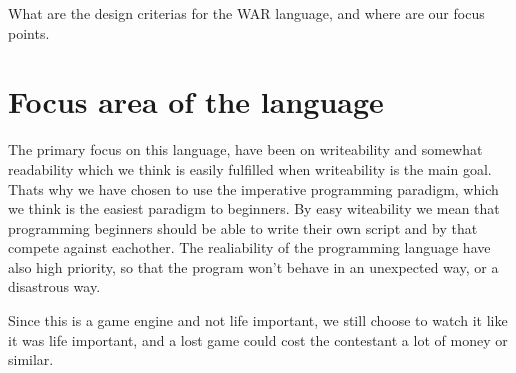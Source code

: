 What are the design criterias for the WAR language, and where are our focus points.

\section{Focus area of the language}

The primary focus on this language, have been on writeability and somewhat readability which we think is easily fulfilled when writeability is the main goal. Thats why we have chosen to use the imperative programming paradigm, which we think is the easiest paradigm to beginners. By easy witeability we mean that programming beginners should be able to write their own script and by that compete against eachother. The realiability of the programming language have also high priority, so that the program won't behave in an unexpected way, or a disastrous way.

Since this is a game engine and not life important, we still choose to watch it like it was life important, and a lost game could cost the contestant a lot of money or similar.



